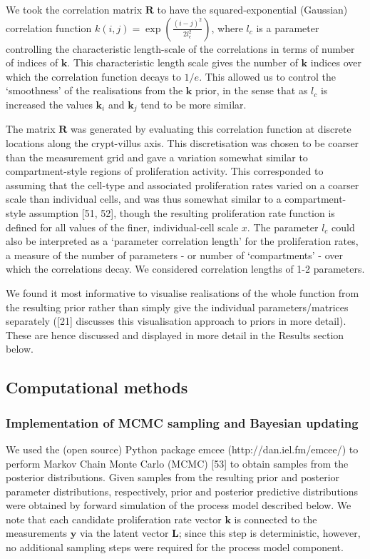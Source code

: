 \documentclass[10pt,letterpaper]{article}
\begin{document}
We took the correlation matrix \(\mathbf{R}\) to have the
squared-exponential (Gaussian) correlation function
\(k(i,j) = \exp(\frac{(i-j)^2}{2l_c^2})\), where \(l_c\) is a parameter
controlling the characteristic length-scale of the correlations in terms
of number of indices of \(\mathbf{k}\). This characteristic length scale
gives the number of \(\mathbf{k}\) indices over which the correlation
function decays to \(1/e\). This allowed us to control the `smoothness'
of the realisations from the \(\mathbf{k}\) prior, in the sense that as
\(l_c\) is increased the values \(\mathbf{k}_i\) and \(\mathbf{k}_j\)
tend to be more similar.

The matrix \(\mathbf{R}\) was generated by evaluating this correlation
function at discrete locations along the crypt-villus axis. This
discretisation was chosen to be coarser than the measurement grid and
gave a variation somewhat similar to compartment-style regions of
proliferation activity. This corresponded to assuming that the cell-type
and associated proliferation rates varied on a coarser scale than
individual cells, and was thus somewhat similar to a compartment-style
assumption {[}51, 52{]}, though the resulting proliferation rate
function is defined for all values of the finer, individual-cell scale
\(x\). The parameter \(l_c\) could also be interpreted as a `parameter
correlation length' for the proliferation rates, a measure of the number
of parameters - or number of `compartments' - over which the
correlations decay. We considered correlation lengths of 1-2 parameters.

We found it most informative to visualise realisations of the whole
function from the resulting prior rather than simply give the individual
parameters/matrices separately ({[}21{]} discusses this visualisation
approach to priors in more detail). These are hence discussed and
displayed in more detail in the Results section below.

\subsection{Computational methods}\label{computational-methods}

\subsubsection{Implementation of MCMC sampling and Bayesian
updating}\label{implementation-of-mcmc-sampling-and-bayesian-updating}

We used the (open source) Python package emcee
(http://dan.iel.fm/emcee/) to perform Markov Chain Monte Carlo (MCMC)
{[}53{]} to obtain samples from the posterior distributions. Given
samples from the resulting prior and posterior parameter distributions,
respectively, prior and posterior predictive distributions were obtained
by forward simulation of the process model described below. We note that
each candidate proliferation rate vector \(\mathbf{k}\) is connected to
the measurements \(\mathbf{y}\) via the latent vector \(\mathbf{L}\);
since this step is deterministic, however, no additional sampling steps
were required for the process model component.
\end{document}
